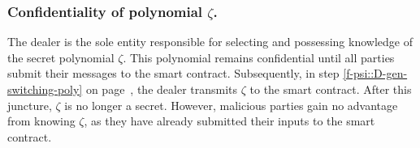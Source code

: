 

\subsubsection{Confidentiality of polynomial $\zeta$.} 

 The dealer is the sole entity responsible for selecting and possessing knowledge of the secret polynomial $\zeta$.  This polynomial remains confidential until all parties submit their messages to the smart contract. Subsequently, in step \ref{f-psi::D-gen-switching-poly} on page~\pageref{f-psi::D-gen-switching-poly}, the dealer transmits $\zeta$ to the smart contract. After this juncture, $\zeta$ is no longer a secret. However, malicious parties gain no advantage from knowing $\zeta$, as they have already submitted their inputs to the smart contract.


